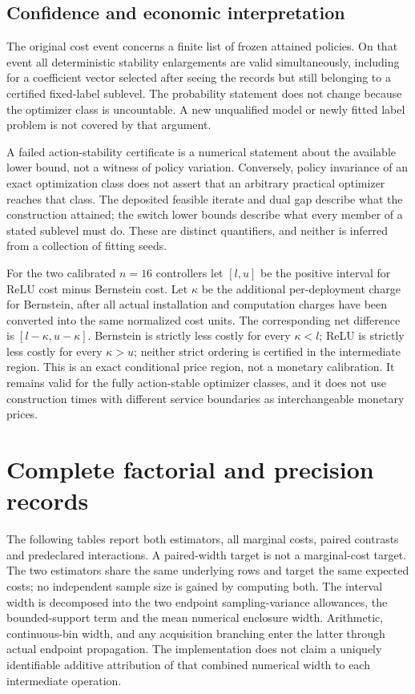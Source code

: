 \subsection{Confidence and economic interpretation}
The original cost event concerns a finite list of frozen attained policies. On that event all deterministic stability enlargements are valid simultaneously, including for a coefficient vector selected after seeing the records but still belonging to a certified fixed-label sublevel. The probability statement does not change because the optimizer class is uncountable. A new unqualified model or newly fitted label problem is not covered by that argument.

A failed action-stability certificate is a numerical statement about the available lower bound, not a witness of policy variation. Conversely, policy invariance of an exact optimization class does not assert that an arbitrary practical optimizer reaches that class. The deposited feasible iterate and dual gap describe what the construction attained; the switch lower bounds describe what every member of a stated sublevel must do. These are distinct quantifiers, and neither is inferred from a collection of fitting seeds.

For the two calibrated $n=16$ controllers let $[l,u]$ be the positive interval for ReLU cost minus Bernstein cost. Let $\kappa$ be the additional per-deployment charge for Bernstein, after all actual installation and computation charges have been converted into the same normalized cost units. The corresponding net difference is $[l-\kappa,u-\kappa]$. Bernstein is strictly less costly for every $\kappa<l$; ReLU is strictly less costly for every $\kappa>u$; neither strict ordering is certified in the intermediate region. This is an exact conditional price region, not a monetary calibration. It remains valid for the fully action-stable optimizer classes, and it does not use construction times with different service boundaries as interchangeable monetary prices.

\section{Complete factorial and precision records}\label{app:factorial81}
The following tables report both estimators, all marginal costs, paired contrasts and predeclared interactions. A paired-width target is not a marginal-cost target. The two estimators share the same underlying rows and target the same expected costs; no independent sample size is gained by computing both. The interval width is decomposed into the two endpoint sampling-variance allowances, the bounded-support term and the mean numerical enclosure width. Arithmetic, continuous-bin width, and any acquisition branching enter the latter through actual endpoint propagation. The implementation does not claim a uniquely identifiable additive attribution of that combined numerical width to each intermediate operation.





